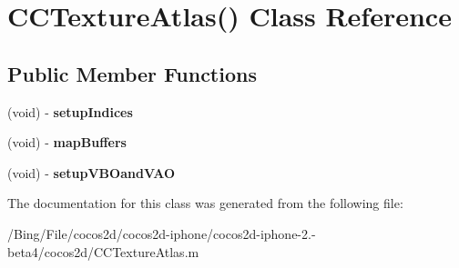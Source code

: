 \hypertarget{interface_c_c_texture_atlas_07_08}{\section{C\-C\-Texture\-Atlas() Class Reference}
\label{interface_c_c_texture_atlas_07_08}
}
\subsection*{Public Member Functions}
\begin{DoxyCompactItemize}
\item 
\hypertarget{interface_c_c_texture_atlas_07_08_ac9d50f6774d0a8fd119a7f7c46c12cd2}{(void) -\/ {\bfseries setup\-Indices}}\label{interface_c_c_texture_atlas_07_08_ac9d50f6774d0a8fd119a7f7c46c12cd2}

\item 
\hypertarget{interface_c_c_texture_atlas_07_08_ac31d4b9a028ac547657b0c87f2ad4f02}{(void) -\/ {\bfseries map\-Buffers}}\label{interface_c_c_texture_atlas_07_08_ac31d4b9a028ac547657b0c87f2ad4f02}

\item 
\hypertarget{interface_c_c_texture_atlas_07_08_a148ecdd24fcce9bb7dbfb5993d0d4613}{(void) -\/ {\bfseries setup\-V\-B\-Oand\-V\-A\-O}}\label{interface_c_c_texture_atlas_07_08_a148ecdd24fcce9bb7dbfb5993d0d4613}

\end{DoxyCompactItemize}


The documentation for this class was generated from the following file\-:\begin{DoxyCompactItemize}
\item 
/\-Bing/\-File/cocos2d/cocos2d-\/iphone/cocos2d-\/iphone-\/2.-\/beta4/cocos2d/C\-C\-Texture\-Atlas.\-m\end{DoxyCompactItemize}
